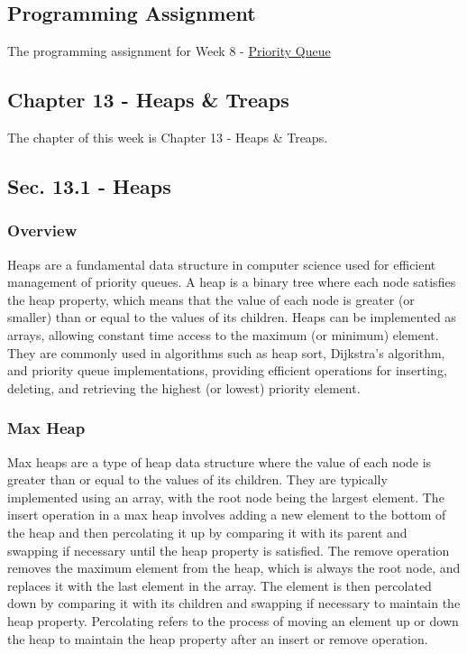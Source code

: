 \subsection{Programming Assignment}

The programming assignment for Week 8 - \href{https://github.com/cu-cspb-2270-Summer-2023/pa6-RelativiBit}{Priority Queue}

\subsection{Chapter 13 - Heaps \& Treaps}

The chapter of this week is Chapter 13 - Heaps \& Treaps.

\subsection*{Sec. 13.1 - Heaps}

\subsubsection{Overview}

Heaps are a fundamental data structure in computer science used for efficient management of priority queues. A heap is a binary tree where each node satisfies the heap property, which means that the 
value of each node is greater (or smaller) than or equal to the values of its children. Heaps can be implemented as arrays, allowing constant time access to the maximum (or minimum) element. They are 
commonly used in algorithms such as heap sort, Dijkstra's algorithm, and priority queue implementations, providing efficient operations for inserting, deleting, and retrieving the highest (or lowest) 
priority element.

\subsubsection{Max Heap}

Max heaps are a type of heap data structure where the value of each node is greater than or equal to the values of its children. They are typically implemented using an array, with the root node being 
the largest element. The insert operation in a max heap involves adding a new element to the bottom of the heap and then percolating it up by comparing it with its parent and swapping if necessary until 
the heap property is satisfied. The remove operation removes the maximum element from the heap, which is always the root node, and replaces it with the last element in the array. The element is then 
percolated down by comparing it with its children and swapping if necessary to maintain the heap property. Percolating refers to the process of moving an element up or down the heap to maintain the heap 
property after an insert or remove operation.

